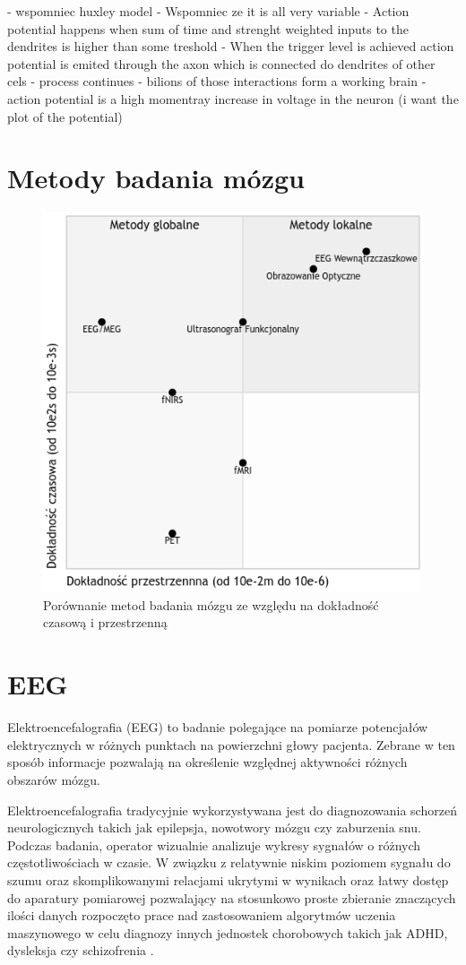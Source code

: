 \documentclass{./assets/wfis}
\begin{document}
- wspomniec huxley model
- Wspomniec ze it is all very variable
- Action potential happens when sum of time and strenght weighted inputs to the dendrites is higher than some treshold
- When the trigger level is achieved action potential is emited through the axon which is connected do dendrites of other cels - process continues
- bilions of those interactions form a working brain
- action potential is a high momentray increase in voltage in the neuron (i want the plot of the potential)

\section{Metody badania mózgu}


\begin{figure}[h]
    \centering
    \includegraphics[width=0.5\columnwidth]{thesis/assets/porownanie_metod_badania_mozgu.png}
    \caption{Porównanie metod badania mózgu ze względu na dokładność czasową i przestrzenną}
    \label{fig:brain-imaging-comparasion}
\end{figure}


\section{EEG}
Elektroencefalografia (EEG) to badanie polegające na pomiarze potencjałów elektrycznych w różnych punktach na powierzchni głowy pacjenta. Zebrane w ten sposób informacje pozwalają na określenie względnej aktywności różnych obszarów mózgu.

Elektroencefalografia tradycyjnie wykorzystywana jest do diagnozowania schorzeń neurologicznych takich jak epilepsja, nowotwory mózgu czy zaburzenia snu. Podczas badania, operator wizualnie analizuje wykresy sygnałów o różnych częstotliwościach w czasie. W związku z relatywnie niskim poziomem sygnału do szumu oraz skomplikowanymi relacjami ukrytymi w wynikach oraz łatwy dostęp do aparatury pomiarowej pozwalający na stosunkowo proste zbieranie znaczących ilości danych rozpoczęto prace nad zastosowaniem algorytmów uczenia maszynowego w celu diagnozy innych jednostek chorobowych takich jak ADHD, dysleksja czy schizofrenia \cite{ahire_comprehensive_2022, joshi_review_2021, clarke_eeg_2002}.
\end{document}
